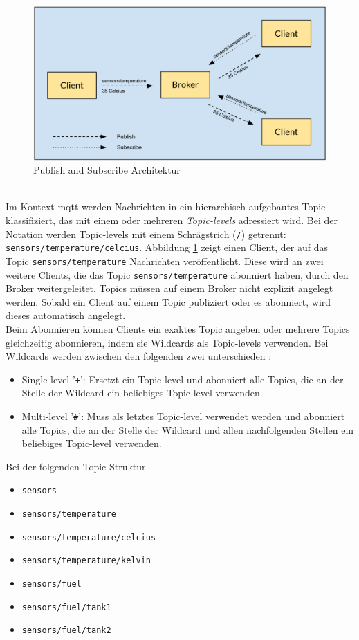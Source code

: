 \begin{figure}
    \centering
    \includegraphics[scale=0.33]{images/publish_subscribe.png}
    \caption{Publish and Subscribe Architektur}
    \label{fig:publish-subscribe}
\end{figure}
\\
Im Kontext \ac{mqtt} werden Nachrichten in ein hierarchisch aufgebautes Topic klassifiziert, das mit einem oder mehreren \textit{Topic-levels} adressiert wird.
Bei der Notation werden Topic-levels mit einem Schrägstrich (\verb|/|) getrennt: \verb|sensors/temperature/celcius|.
Abbildung \ref{fig:publish-subscribe} zeigt einen Client, der auf das Topic \verb|sensors/temperature| Nachrichten veröffentlicht. Diese wird an zwei weitere Clients, die das Topic \verb|sensors/temperature| abonniert haben, durch den Broker weitergeleitet. Topics müssen auf einem Broker nicht explizit angelegt werden. Sobald ein Client auf einem Topic publiziert oder es abonniert, wird dieses automatisch angelegt.\cite{WhatMQTTDefinition}\\
Beim Abonnieren können Clients ein exaktes Topic angeben oder mehrere Topics gleichzeitig abonnieren, indem sie Wildcards als Topic-levels verwenden.
Bei Wildcards werden zwischen den folgenden zwei unterschieden \cite{teamMQTTTopicsBest}:
\begin{itemize}
    \item Single-level '\verb|+|': Ersetzt ein Topic-level und abonniert alle Topics, die an der Stelle der Wildcard ein beliebiges Topic-level verwenden.
    \item Multi-level '\verb|#|': Muss als letztes Topic-level verwendet werden und abonniert alle Topics, die an der Stelle der Wildcard und allen nachfolgenden Stellen ein beliebiges Topic-level verwenden.
\end{itemize}
Bei der folgenden Topic-Struktur
\begin{itemize}
    \item \verb|sensors|
    \item \verb|sensors/temperature|
    \item \verb|sensors/temperature/celcius|
    \item \verb|sensors/temperature/kelvin|
    \item \verb|sensors/fuel|
    \item \verb|sensors/fuel/tank1|
    \item \verb|sensors/fuel/tank2|
\end{itemize}
